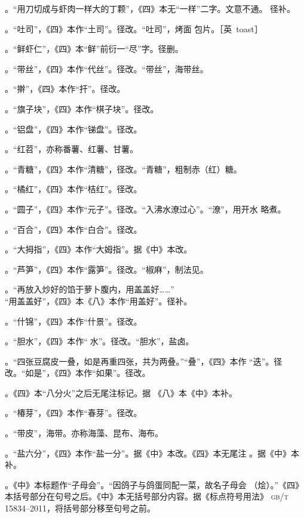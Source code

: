 \begin{list}{}
。“用刀切成与虾肉一样大的丁颗”，《四》本无“一样”二字。文意不通。
径补。

。“吐司”，《四》本作“土司”。径改。“吐司”，烤面
包片。［英~toast］

。“鲜虾仁”，《四》本“鲜”前衍一“尽”字。径删。

。“带丝”，《四》本作“代丝”。径改。“带丝”，海带丝。

。“擀”，《四》本作“扞”。径改。

。“旗子块”，《四》本作“棋子块”。径改。

。“铝盘”，《四》本作“锑盘”。径改。

。“红苕”，亦称番薯、红薯、甘薯。

。“青糖”，《四》本作“清糖”，径改。“青糖”，粗制赤（红）糖。

。“橘红”，《四》本作“桔红”。径改。

。“圆子”，《四》本作“元子”。径改。“入沸水潦过心”。“潦”，用开水
略煮。

。“百合”，《四》本作“白合”。径改。

。“大拇指”，《四》本作“大姆指”。据《中》本改。

。“芦笋”，《四》本作“露笋”。径改。“椒麻”，制法见。

。“再放入炒好的馅于萝卜腹内，用盖盖好……”\\%
“用盖盖好”，《四》本《八》本作“用盖好”。径补。

。“什锦”，《四》本作“什景”。径改。

。“胆水”，《四》本作“𥑲水”。径改。“胆水”，盐卤。

。“四张豆腐皮一叠，如是再重四张，共为两叠。”“叠”，《四》本作
“迭”。径改。“如是”，《四》本作“如果”。径改。

。《四》本“八分火”之后无尾注标记{\footnotesize{}}。据
《八》本《中》本补。

。“椿芽”，《四》本作“春芽”。径改。

。“带皮”，海带。亦称海藻、昆布、海布。

。“盐六分”，《四》本作“盐一分”。据《中》本改。《四》本无尾注%
{\footnotesize{}}。据《中》本补。

。《中》本标题作“子母会”。“因鸽子与鸽蛋同配一菜，故名子母会
（烩）。”《四》本括号部分在句号之后。《中》本无括号部分内容。据《标点符号用法》
\textsc{gb/t 15834--2011}，将括号部分移至句号之前。


\end{list}
